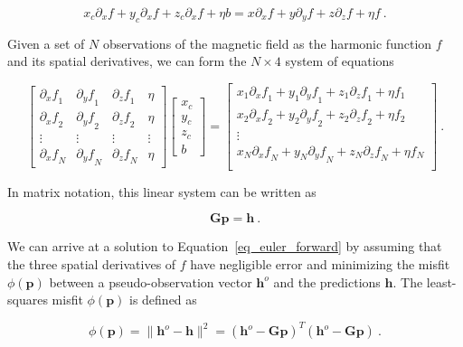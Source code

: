 \begin{equation}
x_c \partial_x f + y_c \partial_x f + z_c \partial_x f + \eta b
=
x \partial_x f + y \partial_y f + z \partial_z f + \eta f
\ .
\end{equation}

Given a set of $N$ observations of the magnetic field as the harmonic function
$f$ and its spatial derivatives, we can form the $N \times 4$ system of
equations

\begin{equation}
\begin{bmatrix}
  {\partial_x f}_1 & {\partial_y f}_1 & {\partial_z f}_1 & \eta \\
  {\partial_x f}_2 & {\partial_y f}_2 & {\partial_z f}_2 & \eta \\
  \vdots & \vdots & \vdots & \vdots \\
  {\partial_x f}_N & {\partial_y f}_N & {\partial_z f}_N & \eta
\end{bmatrix}
\begin{bmatrix}
  x_c \\ y_c \\ z_c \\ b
\end{bmatrix}
=
\begin{bmatrix}
  x_1 {\partial_x f}_1 + y_1 {\partial_y f}_1 + z_1 {\partial_z f}_1 + \eta f_1 \\
  x_2 {\partial_x f}_2 + y_2 {\partial_y f}_2 + z_2 {\partial_z f}_2 + \eta f_2 \\
  \vdots \\
  x_N {\partial_x f}_N + y_N {\partial_y f}_N + z_N {\partial_z f}_N + \eta f_N \\
\end{bmatrix}
\ .
\end{equation}

In matrix notation, this linear system can be written as

\begin{equation}
\label{eq_euler_forward}
\mathbf{G} \mathbf{p} = \mathbf{h} \ .
\end{equation}

We can arrive at a solution to Equation~\ref{eq_euler_forward} by assuming that
the three spatial derivatives of $f$ have negligible error and minimizing the
misfit $\phi(\mathbf{p})$ between a pseudo-observation vector $\mathbf{h}^o$
and the predictions $\mathbf{h}$. The least-squares misfit $\phi(\mathbf{p})$
is defined as

\begin{equation}
\label{ZTSuSBbL16}
\phi(\mathbf{p}) = \|\mathbf{h}^o - \mathbf{h}\|^2 = (\mathbf{h}^o - \mathbf{G}\mathbf{p})^T (\mathbf{h}^o - \mathbf{G}\mathbf{p})\ .
\end{equation}

